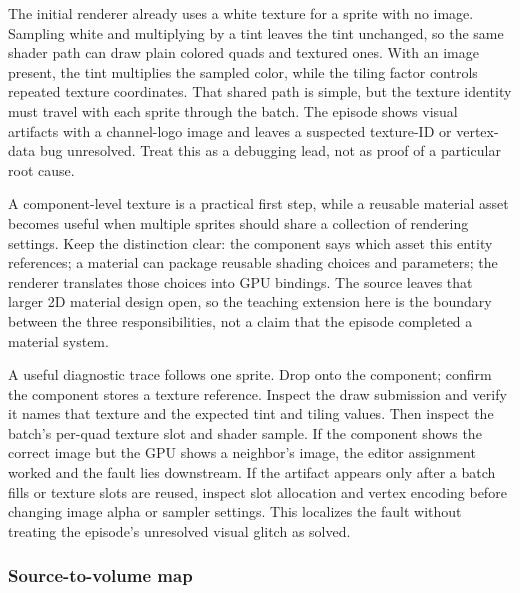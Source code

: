 The initial renderer already uses a white texture for a sprite with no image. Sampling white and multiplying by a tint leaves the tint unchanged, so the same shader path can draw plain colored quads and textured ones. With an image present, the tint multiplies the sampled color, while the tiling factor controls repeated texture coordinates. That shared path is simple, but the texture identity must travel with each sprite through the batch. The episode shows visual artifacts with a channel-logo image and leaves a suspected texture-ID or vertex-data bug unresolved. Treat this as a debugging lead, not as proof of a particular root cause.

A component-level texture is a practical first step, while a reusable material asset becomes useful when multiple sprites should share a collection of rendering settings. Keep the distinction clear: the component says which asset this entity references; a material can package reusable shading choices and parameters; the renderer translates those choices into GPU bindings. The source leaves that larger 2D material design open, so the teaching extension here is the boundary between the three responsibilities, not a claim that the episode completed a material system.

A useful diagnostic trace follows one sprite. Drop  onto the component; confirm the component stores a texture reference. Inspect the draw submission and verify it names that texture and the expected tint and tiling values. Then inspect the batch's per-quad texture slot and shader sample. If the component shows the correct image but the GPU shows a neighbor's image, the editor assignment worked and the fault lies downstream. If the artifact appears only after a batch fills or texture slots are reused, inspect slot allocation and vertex encoding before changing image alpha or sampler settings. This localizes the fault without treating the episode's unresolved visual glitch as solved.

\subsubsection{Source-to-volume map}\label{06-engine-ii-ch026-source-to-volume-map-1}

\hypertarget{06-engine-ii-ch026-source-to-volume-map-1}{}

